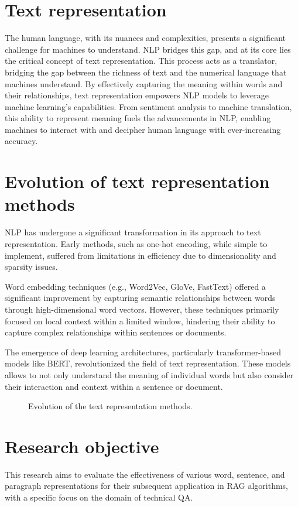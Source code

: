 \section{Text representation}
The human language, with its nuances and complexities, presents a significant challenge for machines to understand.
\ac{NLP} bridges this gap, and at its core lies the critical concept of text representation.
This process acts as a translator, bridging the gap between the richness of text and the numerical language that machines understand.
By effectively capturing the meaning within words and their relationships, text representation empowers \ac{NLP} models to leverage machine learning's capabilities.
From sentiment analysis to machine translation, this ability to represent meaning fuels the advancements in \ac{NLP}, enabling machines to interact with and decipher human language with ever-increasing accuracy.

\section{Evolution of text representation methods}

\ac{NLP} has undergone a significant transformation in its approach to text representation.
Early methods, such as one-hot encoding, while simple to implement, suffered from limitations in efficiency due to dimensionality and sparsity issues.

Word embedding techniques (e.g., Word2Vec, GloVe, FastText) offered a significant improvement by capturing semantic relationships between words through high-dimensional word vectors.
However, these techniques primarily focused on local context within a limited window, hindering their ability to capture complex relationships within sentences or documents.

The emergence of deep learning architectures, particularly transformer-based models like \ac{BERT}, revolutionized the field of text representation.
These models allows to not only understand the meaning of individual words but also consider their interaction and context within a sentence or document.

\begin{figure}
  \centering
    
  \caption{Evolution of the text representation methods.}
  \label{fig:ecolution_text_representation}
\end{figure}

\section{Research objective}

This research aims to evaluate the effectiveness of various word, sentence, and paragraph representations for their subsequent application in \ac{RAG} algorithms, with a specific focus on the domain of technical \ac{QA}.